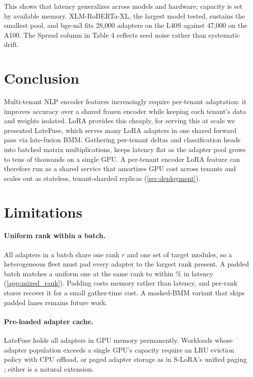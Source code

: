 \documentclass[11pt]{article}
\newcommand{\sysname}{LateFuse}
\begin{document}
This shows that latency generalizes across models and hardware; capacity is set by available memory.
XLM-RoBERTa-XL, the largest model tested, sustains the smallest pool, and bge-m3 fits 28,000 adapters
on the L40S against 47,000 on the A100. The Spread column in Table 4 reflects seed noise rather than systematic drift.

\section{Conclusion}
\label{sec:conclusion}
Multi-tenant NLP encoder features increasingly require per-tenant
adaptation: it improves accuracy over a shared frozen encoder while keeping
each tenant's data and weights isolated. LoRA provides this cheaply, for
serving this at scale we presented \sysname, which serves many LoRA adapters
in one shared forward pass via late-fusion BMM. Gathering per-tenant deltas
and classification heads into batched matrix multiplications, keeps latency flat as
the adapter pool grows to tens of thousands on a single GPU. A per-tenant
encoder LoRA feature can therefore run as a shared service that amortizes
GPU cost across tenants and scales out as stateless, tenant-sharded replicas
(\ref{sec:deployment}).

\section*{Limitations}

\paragraph{Uniform rank within a batch.}
All adapters in a batch share one rank $r$ and one set of target modules, so a
heterogeneous fleet must pad every adapter to the largest rank present.
A padded batch matches a uniform one at the same rank to within
\MixedRankOverheadMaxPct\% in latency (\ref{app:mixed_rank}).
Padding costs memory rather than latency,
and per-rank stores recover it for a small gather-time cost.
A masked-BMM variant that skips padded lanes remains future work.

\paragraph{Pre-loaded adapter cache.}
\sysname{} holds all adapters in GPU memory permanently.
Workloads whose adapter population exceeds a single GPU's capacity require
an LRU eviction policy with CPU offload, or paged adapter storage as in
S-LoRA's unified paging \cite{sheng2024slora}; either is a natural extension.
\end{document}
